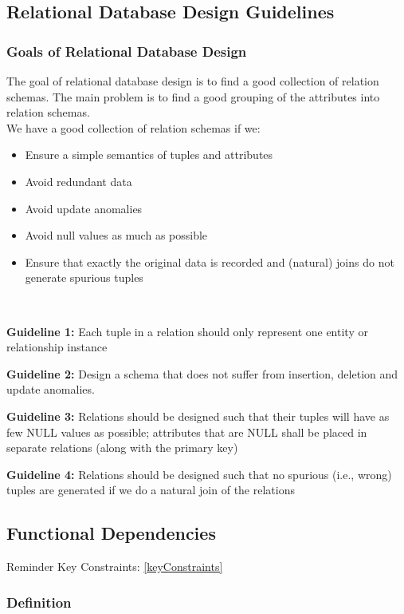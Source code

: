 \subsection{Relational Database Design Guidelines}

\subsubsection{Goals of Relational Database Design}
The goal of relational database design is to find a good collection of relation schemas. The main problem is to find a good grouping of the attributes into relation schemas.\\
We have a good collection of relation schemas if we:
\begin{itemize}[label=\(\rhd\)]
    \item Ensure a simple semantics of tuples and attributes
    \item Avoid redundant data
    \item Avoid update anomalies
    \item Avoid null values as much as possible
    \item Ensure that exactly the original data is recorded and (natural) joins do not generate spurious tuples
\end{itemize}\

\textbf{Guideline 1:} Each tuple in a relation should only represent one entity or relationship instance \

\textbf{Guideline 2:} Design a schema that does not suffer from insertion, deletion and update anomalies.\

\textbf{Guideline 3:} Relations should be designed such that their tuples will have as few NULL values as possible; attributes that are NULL shall be placed in separate relations (along with the primary key)\

\textbf{Guideline 4:} Relations should be designed such that no spurious (i.e., wrong) tuples are generated if we do a natural join of the relations

\subsection{Functional Dependencies}
Reminder Key Constraints: \ref{keyConstraints}


\subsubsection{Definition}

